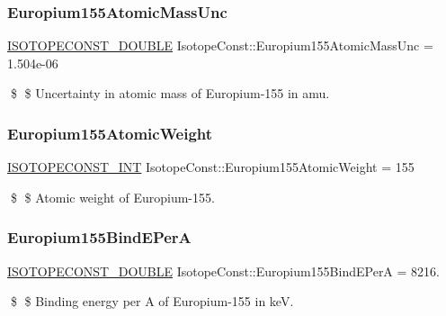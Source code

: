 \subsubsection{\texorpdfstring{Europium155\+Atomic\+Mass\+Unc}{Europium155AtomicMassUnc}}
{\footnotesize\ttfamily \mbox{\hyperlink{group___isotope_const-_macros_ga8f45a7272ce02c0b4c65c44636ed719a}{I\+S\+O\+T\+O\+P\+E\+C\+O\+N\+S\+T\+\_\+\+D\+O\+U\+B\+LE}} Isotope\+Const\+::\+Europium155\+Atomic\+Mass\+Unc = 1.\+504e-\/06}

\$ \$ Uncertainty in atomic mass of Europium-\/155 in amu. \mbox{\label{group___isotope_const-_europium-_eu155_ga4d3c531d3922a423b1b4d5c62b0a1071}} 
\subsubsection{\texorpdfstring{Europium155\+Atomic\+Weight}{Europium155AtomicWeight}}
{\footnotesize\ttfamily \mbox{\hyperlink{group___isotope_const-_macros_ga5f18360b3e99483a35c32d789e62621c}{I\+S\+O\+T\+O\+P\+E\+C\+O\+N\+S\+T\+\_\+\+I\+NT}} Isotope\+Const\+::\+Europium155\+Atomic\+Weight = 155}

\$ \$ Atomic weight of Europium-\/155. \mbox{\label{group___isotope_const-_europium-_eu155_ga87440727ed636b9c13849bea8015653a}} 
\subsubsection{\texorpdfstring{Europium155\+Bind\+E\+PerA}{Europium155BindEPerA}}
{\footnotesize\ttfamily \mbox{\hyperlink{group___isotope_const-_macros_ga8f45a7272ce02c0b4c65c44636ed719a}{I\+S\+O\+T\+O\+P\+E\+C\+O\+N\+S\+T\+\_\+\+D\+O\+U\+B\+LE}} Isotope\+Const\+::\+Europium155\+Bind\+E\+PerA = 8216.}

\$ \$ Binding energy per A of Europium-\/155 in keV. \mbox{\label{group___isotope_const-_europium-_eu155_gaaffadfe39bf4ea35f1c52293a03b700f}} 
